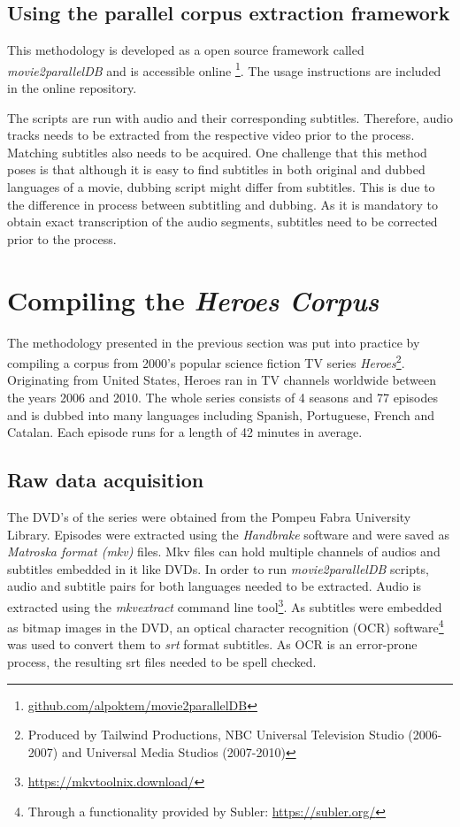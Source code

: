 

\subsection*{Using the parallel corpus extraction framework}
This methodology is developed as a open source framework called \textit{movie2parallelDB} and is accessible online \footnote{\url{github.com/alpoktem/movie2parallelDB}}. The usage instructions are included in the online repository. 

The scripts are run with audio and their corresponding subtitles. Therefore, audio tracks needs to be extracted from the respective video prior to the process. Matching subtitles also needs to be acquired. 
One challenge that this method poses is that although it is easy to find subtitles in both original and dubbed languages of a movie, dubbing script might differ from subtitles. This is due to the difference in process between subtitling and dubbing. As it is mandatory to obtain exact transcription of the audio segments, subtitles need to be corrected prior to the process. 

\section{Compiling the \textit{Heroes Corpus}}
\label{corpusWorks:heroes}
The methodology presented in the previous section was put into practice by compiling a corpus from 2000's popular science fiction TV series \textit{Heroes}\footnote{Produced by Tailwind Productions, NBC Universal Television Studio (2006-2007) and Universal Media Studios (2007-2010)}. Originating from United States, Heroes ran in TV channels worldwide between the years 2006 and 2010. The whole series consists of 4 seasons and 77 episodes and is dubbed into many languages including Spanish, Portuguese, French and Catalan. Each episode runs for a length of 42 minutes in average. 

\subsection*{Raw data acquisition}
The DVD's of the series were obtained from the Pompeu Fabra University Library. Episodes were extracted using the \textit{Handbrake} software and were saved as \textit{Matroska format (mkv)} files. Mkv files can hold multiple channels of audios and subtitles embedded in it like DVDs. In order to run \textit{movie2parallelDB} scripts, audio and subtitle pairs for both languages needed to be extracted. Audio is extracted using the \textit{mkvextract} command line tool\footnote{\url{https://mkvtoolnix.download/}}. As subtitles were embedded as bitmap images in the DVD, an optical character recognition (OCR) software\footnote{Through a functionality provided by Subler: \url{https://subler.org/}} was used to convert them to \textit{srt} format subtitles. As OCR is an error-prone process, the resulting srt files needed to be spell checked. 

